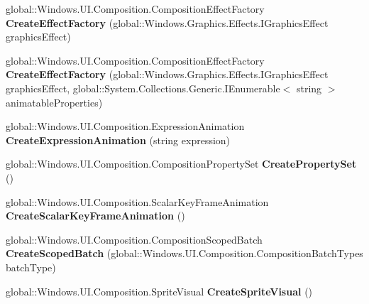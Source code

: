 \begin{DoxyCompactItemize}
global\+::\+Windows.\+U\+I.\+Composition.\+Composition\+Effect\+Factory {\bfseries Create\+Effect\+Factory} (global\+::\+Windows.\+Graphics.\+Effects.\+I\+Graphics\+Effect graphics\+Effect)
\item 
\mbox{\label{interface_windows_1_1_u_i_1_1_composition_1_1_i_compositor_ad3ceab4f5a5f9bcd7b75ff2449c924f2}} 
global\+::\+Windows.\+U\+I.\+Composition.\+Composition\+Effect\+Factory {\bfseries Create\+Effect\+Factory} (global\+::\+Windows.\+Graphics.\+Effects.\+I\+Graphics\+Effect graphics\+Effect, global\+::\+System.\+Collections.\+Generic.\+I\+Enumerable$<$ string $>$ animatable\+Properties)
\item 
\mbox{\label{interface_windows_1_1_u_i_1_1_composition_1_1_i_compositor_a6edffff7da37deafae21b5d37ae75419}} 
global\+::\+Windows.\+U\+I.\+Composition.\+Expression\+Animation {\bfseries Create\+Expression\+Animation} (string expression)
\item 
\mbox{\label{interface_windows_1_1_u_i_1_1_composition_1_1_i_compositor_a65caaced591df89e953360feef3dc21c}} 
global\+::\+Windows.\+U\+I.\+Composition.\+Composition\+Property\+Set {\bfseries Create\+Property\+Set} ()
\item 
\mbox{\label{interface_windows_1_1_u_i_1_1_composition_1_1_i_compositor_a0fbfc1dc456d3dee8d1faf78bfe40c9a}} 
global\+::\+Windows.\+U\+I.\+Composition.\+Scalar\+Key\+Frame\+Animation {\bfseries Create\+Scalar\+Key\+Frame\+Animation} ()
\item 
\mbox{\label{interface_windows_1_1_u_i_1_1_composition_1_1_i_compositor_ace9715f39dc12e329752515c931e5b77}} 
global\+::\+Windows.\+U\+I.\+Composition.\+Composition\+Scoped\+Batch {\bfseries Create\+Scoped\+Batch} (global\+::\+Windows.\+U\+I.\+Composition.\+Composition\+Batch\+Types batch\+Type)
\item 
\mbox{\label{interface_windows_1_1_u_i_1_1_composition_1_1_i_compositor_adcaefeb1c16a19b1a8bf373e365eab4e}} 
global\+::\+Windows.\+U\+I.\+Composition.\+Sprite\+Visual {\bfseries Create\+Sprite\+Visual} ()

\end{DoxyCompactItemize}
